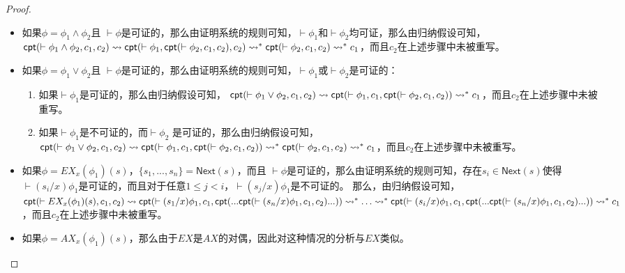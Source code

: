 \begin{proof}
\begin{itemize}
		\item 如果$\phi=\phi_1\wedge\phi_2$且 $\vdash\phi$是可证的，那么由证明系统的规则可知，$\vdash\phi_1$和$\vdash\phi_2$均可证，那么由归纳假设可知， $\textsf{cpt}(\vdash\phi_1\wedge\phi_2,c_1,c_2)\rightsquigarrow\textsf{cpt}(\vdash \phi_1, \textsf{cpt}(\vdash\phi_2,c_1,c_2), c_2)\rightsquigarrow^*\textsf{cpt}(\vdash\phi_2,c_1,c_2)\rightsquigarrow^*c_1$，而且$c_2$在上述步骤中未被重写。
		
		\item 如果$\phi = \phi_1\vee\phi_2$且 $\vdash\phi$是可证的，那么由证明系统的规则可知，$\vdash\phi_1$或$\vdash\phi_2$是可证的：
		\begin{enumerate}
			\item 如果$\vdash\phi_1$是可证的，那么由归纳假设可知， $\textsf{cpt}(\vdash\phi_1\vee\phi_2,c_1,c_2)\rightsquigarrow \textsf{cpt}(\vdash \phi_1,c_1,\textsf{cpt}(\vdash\phi_2,c_1,c_2))\rightsquigarrow^*c_1$，而且$c_2$在上述步骤中未被重写。
			\item 如果$\vdash\phi_1$是不可证的，而$\vdash\phi_2$ 是可证的，那么由归纳假设可知，$\textsf{cpt}(\vdash\phi_1\vee\phi_2,c_1,c_2)\rightsquigarrow \textsf{cpt}(\vdash \phi_1,c_1,\textsf{cpt}(\vdash\phi_2,c_1,c_2))\rightsquigarrow^*\textsf{cpt}(\vdash\phi_2,c_1,c_2)\rightsquigarrow^*c_1$，而且$c_2$在上述步骤中未被重写。
		\end{enumerate}
		
		\item 如果$\phi = EX_x(\phi_1)(s)$，$\{s_1,...,s_n\} = \textsf{Next}(s)$，而且 $\vdash\phi$是可证的，那么由证明系统的规则可知，存在$s_i\in\textsf{Next}(s)$使得 $\vdash(s_i/x)\phi_1$是可证的，而且对于任意$1\le j<i$，$\vdash(s_j/x)\phi_1$是不可证的。 那么，由归纳假设可知， \\$\textsf{cpt}(\vdash EX_x(\phi_1)(s),c_1,c_2)\rightsquigarrow \\\textsf{cpt}(\vdash(s_1/x)\phi_1, c_1, \textsf{cpt}(...\textsf{cpt}(\vdash(s_n/x)\phi_1, c_1, c_2)...))\\\rightsquigarrow^*\ldots\rightsquigarrow^*\\
		\textsf{cpt}(\vdash(s_i/x)\phi_1, c_1, \textsf{cpt}(...\textsf{cpt}(\vdash(s_n/x)\phi_1, c_1, c_2)...))\\\rightsquigarrow^* c_1$，而且$c_2$在上述步骤中未被重写。
		
		\item
		如果$\phi = AX_x(\phi_1)(s)$，那么由于$EX$是$AX$的对偶，因此对这种情况的分析与$EX$类似。
		

\end{itemize}
\end{proof}
